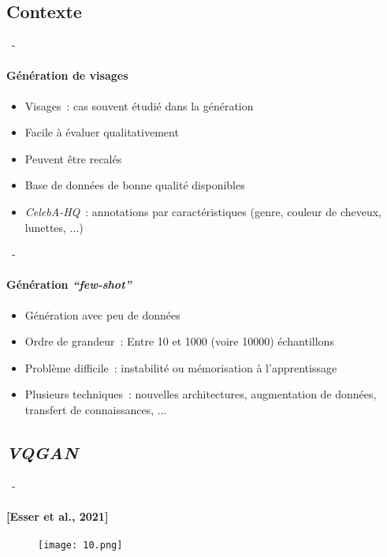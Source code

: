 \documentclass[aspectratio=169, 22pt]{beamer}
\begin{document}
\subsection{Contexte}
\begin{frame}{\secname~- \subsecname}
  \framesubtitle{Génération de visages}
  \begin{itemize}
  \item Visages : cas souvent étudié dans la génération
  \item Facile à évaluer qualitativement
  \item Peuvent être recalés
  \item Base de données de bonne qualité disponibles
  \item \emph{CelebA-HQ} : annotations par caractéristiques (genre, couleur de cheveux, lunettes, ...)
  \end{itemize}
\end{frame}

\begin{frame}{\secname~- \subsecname}
  \framesubtitle{Génération \emph{``few-shot''}}
  \begin{itemize}
  \item Génération avec peu de données
  \item Ordre de grandeur : Entre 10 et 1000 (voire 10000) échantillons
  \item Problème difficile : instabilité ou mémorisation à l'apprentissage

    \vspace{1em}
  \item Plusieurs techniques : nouvelles architectures, augmentation de données, transfert de connaissances, ...
  \end{itemize}
\end{frame}

\subsection{\emph{VQGAN}}
\begin{frame}{\secname~- \subsecname}
  \framesubtitle{[Esser et al., 2021]}
  \begin{figure}
    \texttt{[image: 10.png]}
  \end{figure}
\end{frame}
\end{document}
